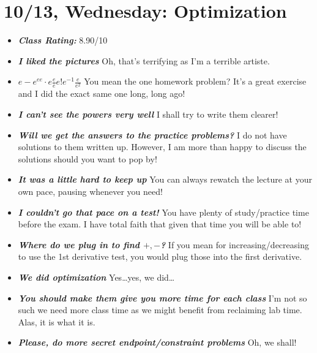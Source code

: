 \documentclass[11pt,letterpaper]{article}
\begin{document}
\newpage
\section*{10/13, Wednesday: Optimization\label{10-13}}

\begin{itemize}
\item {\bfseries\itshape Class Rating:} 8.90/10

\item {\bfseries\itshape I liked the pictures} Oh, that's terrifying as I'm a terrible artiste. 

\item {\bfseries\itshape $e - e^{ee} \cdot e \frac{e}{e} e! e^{-1} \frac{e}{e^2}$} You mean the one homework problem? It's a great exercise and I did the exact same one long, long ago!

\item {\bfseries\itshape I can't see the powers very well} I shall try to write them clearer!

\item {\bfseries\itshape Will we get the answers to the practice problems?} I do not have solutions to them written up. However, I am more than happy to discuss the solutions should you want to pop by!

\item {\bfseries\itshape It was a little hard to keep up} You can always rewatch the lecture at your own pace, pausing whenever you need!

\item {\bfseries\itshape I couldn't go that pace on a test!} You have plenty of study/practice time before the exam. I have total faith that given that time you will be able to!

\item {\bfseries\itshape Where do we plug in to find $+, -$?} If you mean for increasing/decreasing to use the 1st derivative test, you would plug those into the first derivative.

\item {\bfseries\itshape We did optimization} Yes\dots yes, we did\dots

\item {\bfseries\itshape You should make them give you more time for each class} I'm not so such we need more class time as we might benefit from reclaiming lab time. Alas, it is what it is. 

\item {\bfseries\itshape Please, do more secret endpoint/constraint problems} Oh, we shall!


\end{itemize}
\end{document}
